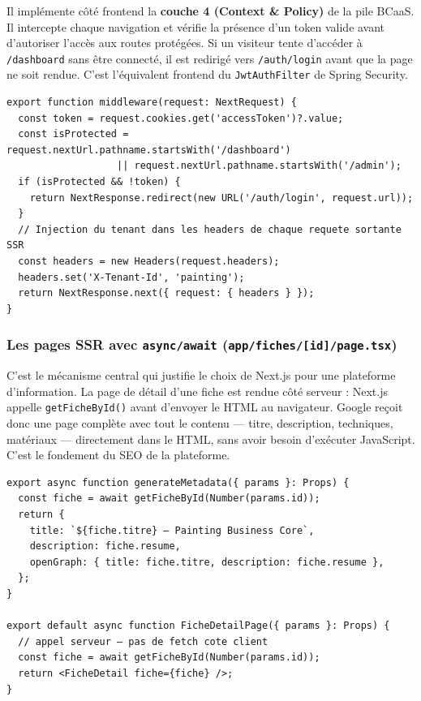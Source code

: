 \documentclass[12pt,a4paper]{report}
\begin{document}
Il implémente côté frontend la \textbf{couche 4 (Context \& Policy)} de la
pile BCaaS. Il intercepte chaque navigation et vérifie la présence d'un
token valide avant d'autoriser l'accès aux routes protégées. Si un visiteur
tente d'accéder à \texttt{/dashboard} sans être connecté, il est redirigé
vers \texttt{/auth/login} avant que la page ne soit rendue. C'est
l'équivalent frontend du \texttt{JwtAuthFilter} de Spring Security.

\begin{lstlisting}[caption={\texttt{middleware.ts} --- protection des routes (couche 4 côté frontend)}]
export function middleware(request: NextRequest) {
  const token = request.cookies.get('accessToken')?.value;
  const isProtected = request.nextUrl.pathname.startsWith('/dashboard')
                   || request.nextUrl.pathname.startsWith('/admin');
  if (isProtected && !token) {
    return NextResponse.redirect(new URL('/auth/login', request.url));
  }
  // Injection du tenant dans les headers de chaque requete sortante SSR
  const headers = new Headers(request.headers);
  headers.set('X-Tenant-Id', 'painting');
  return NextResponse.next({ request: { headers } });
}
\end{lstlisting}

\subsubsection*{Les pages SSR avec \texttt{async/await}
(\texttt{app/fiches/[id]/page.tsx})}

C'est le mécanisme central qui justifie le choix de Next.js pour une
plateforme d'information. La page de détail d'une fiche est rendue côté
serveur : Next.js appelle \texttt{getFicheById()} avant d'envoyer le HTML
au navigateur. Google reçoit donc une page complète avec tout le contenu
--- titre, description, techniques, matériaux --- directement dans le HTML,
sans avoir besoin d'exécuter JavaScript. C'est le fondement du SEO de la
plateforme.

\begin{lstlisting}[caption={\texttt{app/fiches/[id]/page.tsx} --- rendu SSR pour le SEO (couche 3 côté frontend)}]
export async function generateMetadata({ params }: Props) {
  const fiche = await getFicheById(Number(params.id));
  return {
    title: `${fiche.titre} — Painting Business Core`,
    description: fiche.resume,
    openGraph: { title: fiche.titre, description: fiche.resume },
  };
}

export default async function FicheDetailPage({ params }: Props) {
  // appel serveur — pas de fetch cote client
  const fiche = await getFicheById(Number(params.id));
  return <FicheDetail fiche={fiche} />;
}
\end{lstlisting}
\end{document}

